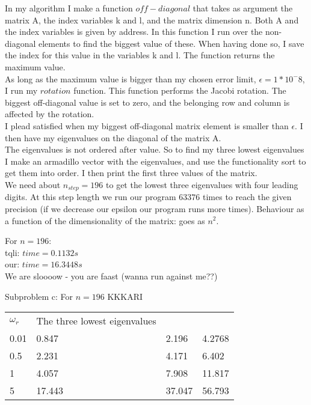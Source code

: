 \documentclass[a4paper,12pt, english]{article}
\begin{document}
  
In my algorithm I make a function $off-diagonal$ that takes as argument the matrix A, the index variables k and l, and the matrix dimension n. Both A and the index variables is given by address. In this function I run over the non-diagonal elements to find the biggest value of these. When having done so, I save the index for this value in the variables k and l. The function returns the maximum value. \\ 

As long as the maximum value is bigger than my chosen error limit, $\epsilon = 1*10^-8$, I run my $rotation$ function. This function performs the Jacobi rotation. The biggest off-diagonal value is set to zero, and the belonging row and column is affected by the rotation. \\

I plead satisfied when my biggest off-diagonal matrix element is smaller than $\epsilon$. I then have my eigenvalues on the diagonal of the matrix A. \\

The eigenvalues is not ordered after value. So to find my three lowest eigenvalues I make an armadillo vector with the eigenvalues, and use the functionality sort to get them into order. I then print the first three values of the matrix. \\

We need about $n_{step} = 196$ to get the lowest three eigenvalues with four leading digits. At this step length we run our program $63376$ times to reach the given precision (if we decrease our epsilon our program runs more times). Behaviour as a function of the dimensionality of the matrix: goes as $n^2$. 

For $n=196$: \\
tqli: $time = 0.1132 s$ \\
our: $time = 16.3448 s $ \\
We are sloooow - you are faast (wanna run against me??)
 
Subproblem c:
For $n=196$
KKKARI 
 \begin{center}
 \begin{tabular}{l |  l l l}
$\omega_r$ &  The three lowest eigenvalues & & \\
 0.01 & 0.847 & 2.196 & 4.2768   \\
 0.5 & 2.231 & 4.171 & 6.402 \\
1 & 4.057 & 7.908 & 11.817\\
5 & 17.443 & 37.047 & 56.793
\end{tabular}
\end{center}
\end{document}
